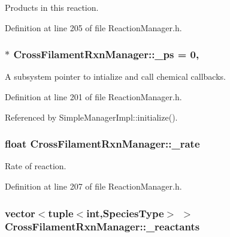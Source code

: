 Products in this reaction. 



Definition at line 205 of file Reaction\+Manager.\+h.

\hypertarget{classCrossFilamentRxnManager_ae13a9fd2fddc2cf5e21df314aba43fdf}{
\subsubsection[{\+\_\+ps}]{ $\ast$ Cross\+Filament\+Rxn\+Manager\+::\+\_\+ps = 0\hspace{0.3cm}{\ttfamily [static]}, {\ttfamily [protected]}}}\label{classCrossFilamentRxnManager_ae13a9fd2fddc2cf5e21df314aba43fdf}


A subsystem pointer to intialize and call chemical callbacks. 



Definition at line 201 of file Reaction\+Manager.\+h.



Referenced by Simple\+Manager\+Impl\+::initialize().

\hypertarget{classCrossFilamentRxnManager_a653389d857c83927af4e621963af3ab1}{
\subsubsection[{\+\_\+rate}]{\setlength{\rightskip}{0pt plus 5cm}float Cross\+Filament\+Rxn\+Manager\+::\+\_\+rate\hspace{0.3cm}{\ttfamily [protected]}}}\label{classCrossFilamentRxnManager_a653389d857c83927af4e621963af3ab1}


Rate of reaction. 



Definition at line 207 of file Reaction\+Manager.\+h.

\hypertarget{classCrossFilamentRxnManager_ad1c41fba7b85d5eedee363b8eeb472d4}{
\subsubsection[{\+\_\+reactants}]{\setlength{\rightskip}{0pt plus 5cm}vector$<$tuple$<$int,{\bf Species\+Type}$>$ $>$ Cross\+Filament\+Rxn\+Manager\+::\+\_\+reactants\hspace{0.3cm}{\ttfamily [protected]}}}\label{classCrossFilamentRxnManager_ad1c41fba7b85d5eedee363b8eeb472d4}



